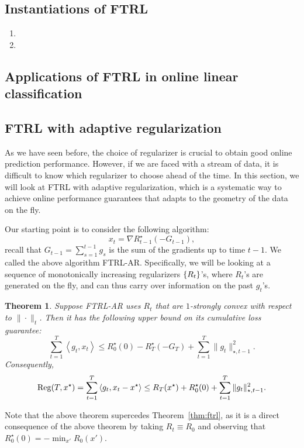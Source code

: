 \documentclass{article}
\newtheorem{theorem}{Theorem}
\DeclareMathOperator*{\Reg}{{\rm Reg}}
\newcommand{\inner}[2]{\left\langle #1,#2 \right\rangle}
\begin{document}
\subsection{Instantiations of FTRL}

\begin{enumerate}
  \item
  \item
\end{enumerate}

\subsection{Applications of FTRL in online linear classification}

\subsection{FTRL with adaptive regularization}
As we have seen before, the choice of regularizer is crucial to obtain good online prediction performance. However, if we are faced with a stream of data, it is difficult to know which regularizer to choose ahead of the time.
In this section, we will look at FTRL with adaptive regularization, which is a systematic way to achieve online performance guarantees that adapts to the geometry of the data on the fly.

Our starting point is to consider the following algorithm:
\[ x_t = \nabla R_{t-1}^\star(-G_{t-1}), \]
recall that $G_{t-1} = \sum_{s=1}^{t-1} g_s$ is the sum of the gradients up to time $t-1$.
We called the above algorithm FTRL-AR.
Specifically, we will be looking at a sequence of monotonically increasing regularizers $\cbr{R_t}$'s, where $R_t$'s are generated on the fly, and can thus carry over information on the past $g_t$'s.

\begin{theorem}
Suppose FTRL-AR uses $R_t$ that are $1$-strongly convex with respect to $\| \cdot \|_{t}$.
Then it has the following upper bound on its cumulative loss guarantee:
\[ \sum_{t=1}^T \inner{g_t}{x_t} \leq R_0^\star(0) - R_T^\star(-G_T) + \sum_{t=1}^T \| g_t \|_{\star, t-1}^2. \]
Consequently,
\[ \Reg(T, x^\star) = \sum_{t=1}^T \inner{g_t}{x_t - x^\star} \leq R_T(x^\star) + R_0^\star(0) + \sum_{t=1}^T \| g_t \|_{\star, t-1}^2. \]
\end{theorem}

Note that the above theorem supercedes Theorem~\ref{thm:ftrl}, as it is a direct consequence of the above theorem by taking $R_t \equiv R_0$ and observing that $R_0^\star(0) = -\min_{x'} R_0(x')$.
\end{document}
